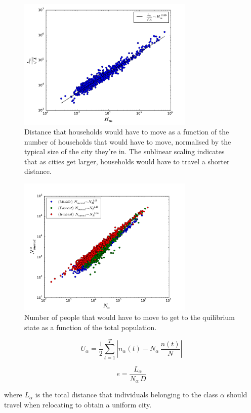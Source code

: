\begin{figure}
    \centering
    \includegraphics[width=0.75\textwidth]{gfx/chapter-segregation/distance_scaling.pdf}
    \caption{Distance that households would have to move as a
    function of the number of households that would have to move, normalised by
    the typical size of the city they're in. The sublinear
scaling indicates that as cities get larger, households would have to travel a
shorter distance.\label{fig:label_fig}}
\end{figure}


\begin{figure}
    \centering
    \includegraphics[width=0.75\textwidth]{gfx/chapter-segregation/moved_scaling}
    \caption{Number of people that would have to move to get to the quilibrium
    state as a function of the total population. \label{fig:label_fig}}
\end{figure}


\begin{equation}
    U_\alpha = \frac{1}{2} \sum_{t=1}^T \left| n_\alpha(t) -
    N_\alpha\,\frac{n(t)}{N}\right|
\end{equation}

\begin{equation}
    e = \frac{L_\alpha}{N_\alpha\,D}
\end{equation}

where $L_\alpha$ is the total distance that individuals belonging to the class
$\alpha$ should travel when relocating to obtain a uniform city.
